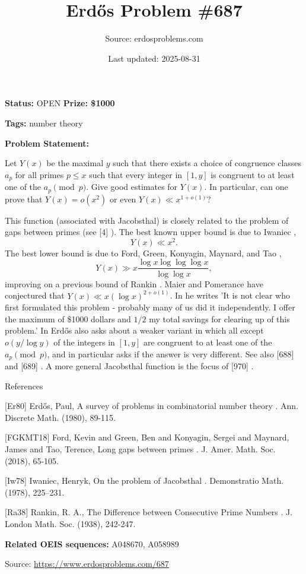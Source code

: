 \documentclass{article}
\title{Erd\H{o}s Problem \#687}
\date{Last updated: 2025-08-31}
\author{Source: erdosproblems.com}
\begin{document}
\maketitle

\noindent\textbf{Status:} OPEN \quad \textbf{Prize: \$1000}

\noindent\textbf{Tags:} number theory

\medskip

\noindent\textbf{Problem Statement:}

Let $Y(x)$ be the maximal $y$ such that there exists a choice of congruence classes $a_p$ for all primes $p\leq x$ such that every integer in $[1,y]$ is congruent to at least one of the $a_p\pmod{p}$. Give good estimates for $Y(x)$. In particular, can one prove that $Y(x)=o(x^2)$ or even $Y(x)\ll x^{1+o(1)}$?




This function (associated with Jacobsthal) is closely related to the problem of gaps between primes (see [4] ). The best known upper bound is due to Iwaniec \cite{Iw78},\[Y(x) \ll x^2.\]The best lower bound is due to Ford, Green, Konyagin, Maynard, and Tao \cite{FGKMT18},\[Y(x) \gg x\frac{\log x\log\log\log x}{\log\log x},\]improving on a previous bound of Rankin \cite{Ra38}. Maier and Pomerance have conjectured that $Y(x)\ll x(\log x)^{2+o(1)}$. In \cite{Er80} he writes 'It is not clear who first formulated this problem - probably many of us did it independently. I offer the maximum of \$1000 dollars and $1/2$ my total savings for clearing up of this problem.' In \cite{Er80} Erd\H{o}s also asks about a weaker variant in which all except $o(y/\log y)$ of the integers in $[1,y]$ are congruent to at least one of the $a_p\pmod{p}$, and in particular asks if the answer is very different. See also [688] and [689] . A more general Jacobsthal function is the focus of [970] .




References

[Er80] Erd\H{o}s, Paul, A survey of problems in combinatorial number theory . Ann. Discrete Math. (1980), 89-115.

[FGKMT18] Ford, Kevin and Green, Ben and Konyagin, Sergei and Maynard, James and Tao, Terence, Long gaps between primes . J. Amer. Math. Soc. (2018), 65-105.

[Iw78] Iwaniec, Henryk, On the problem of {J}acobsthal . Demonstratio Math. (1978), 225--231.

[Ra38] Rankin, R. A., The Difference between Consecutive Prime Numbers . J. London Math. Soc. (1938), 242-247.

\noindent\textbf{Related OEIS sequences:} A048670, A058989


\bigskip
\noindent\small{Source: \url{https://www.erdosproblems.com/687}}
\end{document}
